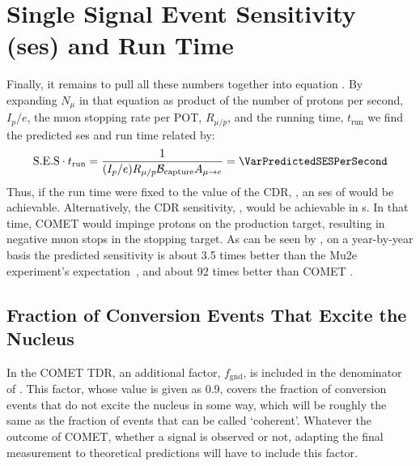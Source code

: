 \section{Single Signal Event Sensitivity (\acs{ses}) and Run Time}
\TabSensParams
\TabSensEstimates
Finally, it remains to pull all these numbers together into equation .
By expanding $N_\mu$ in that equation as product of the number of protons per second, $I_p/e$, the muon stopping rate per \ac{POT}, $R_{\mu/p}$, and the running time, $t_\textrm{run}$ we find the predicted \ac{ses} and run time related by:
\begin{align}
	\eqlabel{sense:runtime}
	\mathrm{S.E.S}\cdot{}t_\textrm{run}=\frac{1}{(I_p/e){R}_{\mu/p}\mathcal{B}_\mathrm{capture} A_{\mu\rightarrow e}}=\VarPredictedSESPerSecond
\end{align}
Thus, if the run time were fixed to the value of the CDR, \VarCDRRunTime[2], an \ac{ses} of \VarPredictedSESCDRRunTime would be achievable.
Alternatively, the CDR sensitivity, \VarPredictedSES, would be achievable in \VarRunTime[2]s.  
In that time, COMET \phaseII would impinge \VarTotalPOT protons on the production target, resulting in \VarTotalMuStops negative muon stops in the stopping target.
As can be seen by , on a year-by-year basis the predicted \phaseII sensitivity is about 3.5 times better than the Mu2e experiment's expectation~\cite{Mu2e2014}, and about 92 times better than COMET \phaseI.

\subsection{Fraction of Conversion Events That Excite the Nucleus}
In the COMET \phaseI TDR, an additional factor, $f_\textrm{gnd}$, is included in the denominator of .
This factor, whose value is given as 0.9, covers the fraction of conversion events that do not excite the nucleus in some way, which will be roughly the same as the fraction of events that can be called `coherent'.
Whatever the outcome of COMET, whether a signal is observed or not, adapting the final measurement to theoretical predictions will have to include this factor.


